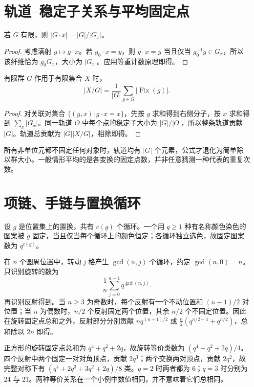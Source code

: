 \documentclass[UTF8,12pt,a4paper,fontset=fandol]{ctexbook}
\begin{document}
\section{轨道--稳定子关系与平均固定点}

\begin{proposition}
若 $G$ 有限，则 $|G\cdot x|=|G|/|G_x|$。
\end{proposition}
\begin{proof}
考虑满射 $g\mapsto g\cdot x$。若 $g_0\cdot x=y$，则 $g\cdot x=y$ 当且仅当 $g_0^{-1}g\in G_x$，所以该纤维恰为 $g_0G_x$，大小为 $|G_x|$。应用等重计数原理即得。
\end{proof}

\begin{theorem}[Burnside 引理]
有限群 $G$ 作用于有限集合 $X$ 时，
\begin{equation}
 |X/G|=\frac1{|G|}\sum_{g\in G}|\operatorname{Fix}(g)|.
 \label{eq:burnside}
\end{equation}
\end{theorem}
\begin{proof}
对关联对集合 $\{(g,x):g\cdot x=x\}$，先按 $g$ 求和得到右侧分子，按 $x$ 求和得到 $\sum_x|G_x|$。同一轨道 $O$ 中每个点的稳定子大小为 $|G|/|O|$，所以整条轨道贡献 $|G|$。轨道总贡献为 $|G||X/G|$，相除即得。
\end{proof}

所有非单位元都不固定任何对象时，轨道均有 $|G|$ 个元素，公式才退化为简单除以群大小。一般情形平均的是各变换的固定点数，并非任意猜测一种代表的重复次数。

\section{项链、手链与置换循环}

设 $g$ 是位置集上的置换，共有 $c(g)$ 个循环。一个用 $q\ge1$ 种有名称颜色染色的图案被 $g$ 固定，当且仅当每个循环上的颜色恒定；各循环独立选色，故固定图案数为 $q^{c(g)}$。

在 $n$ 个圆周位置中，转动 $j$ 格产生 $\gcd(n,j)$ 个循环，约定 $\gcd(n,0)=n$。只识别旋转的数为
\[
 \frac1n\sum_{j=0}^{n-1}q^{\gcd(n,j)}.
\]
再识别反射得到。当 $n\ge3$ 为奇数时，每个反射有一个不动位置和 $(n-1)/2$ 对位置；当 $n$ 为偶数时，$n/2$ 个反射固定两个位置，其余 $n/2$ 个不固定位置。因此在旋转固定点总和之外，反射部分分别贡献 $nq^{(n+1)/2}$ 或 $\frac n2(q^{n/2+1}+q^{n/2})$，总和除以 $2n$ 即得。

\begin{example}[正方形顶点染色]
正方形的旋转固定点总和为 $q^4+q^2+2q$，故旋转等价类数为 $(q^4+q^2+2q)/4$。四个反射中两个固定一对对角顶点，贡献 $2q^3$；两个交换两对顶点，贡献 $2q^2$，故完整对称下有 $(q^4+2q^3+3q^2+2q)/8$ 类。$q=2$ 时两者都为 $6$；$q=3$ 时分别为 $24$ 与 $21$。两种等价关系在一个小例中数值相同，并不意味着它们总相同。
\end{example}
\end{document}
